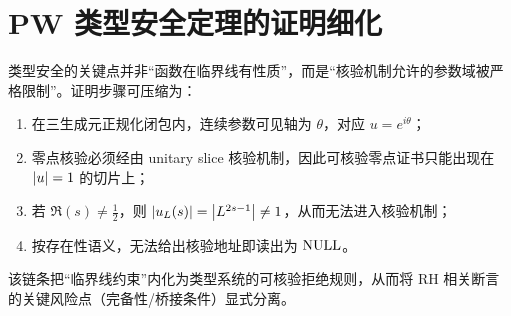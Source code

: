 \section{PW 类型安全定理的证明细化}\label{app:type-safety-details}

类型安全的关键点并非“函数在临界线有性质”，而是“核验机制允许的参数域被严格限制”。证明步骤可压缩为：
\begin{enumerate}
  \item 在三生成元正规化闭包内，连续参数可见轴为 $\theta$，对应 $u=e^{i\theta}$；
  \item 零点核验必须经由 unitary slice 核验机制，因此可核验零点证书只能出现在 $\left\lvert u\right\rvert=1$ 的切片上；
  \item 若 $\Re(s)\neq\tfrac12$，则 $\left\lvert u_L(s)\right\rvert=\left\lvert L^{2s-1}\right\rvert\neq 1$，从而无法进入核验机制；
  \item 按存在性语义，无法给出核验地址即读出为 $\mathrm{NULL}$。
\end{enumerate}
该链条把“临界线约束”内化为类型系统的可核验拒绝规则，从而将 RH 相关断言的关键风险点（完备性/桥接条件）显式分离。

